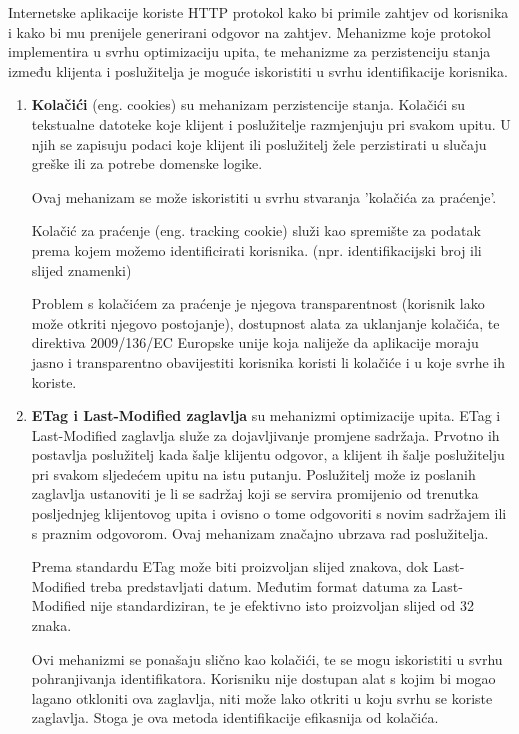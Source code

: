 \documentclass[times, utf8, zavrsni]{fer}
\begin{document}
Internetske aplikacije koriste HTTP protokol kako bi primile zahtjev od
korisnika i kako bi mu prenijele generirani odgovor na zahtjev. Mehanizme koje
protokol implementira u svrhu optimizaciju upita, te mehanizme za perzistenciju
stanja između klijenta i poslužitelja je moguće iskoristiti u svrhu
identifikacije korisnika.

\begin{enumerate}
  \item \textbf{Kolačići} (eng. cookies) su mehanizam perzistencije stanja.
    Kolačići su tekstualne datoteke koje klijent i poslužitelje razmjenjuju pri
    svakom upitu. U njih se zapisuju podaci koje klijent ili poslužitelj
    žele perzistirati u slučaju greške ili za potrebe domenske logike.

    Ovaj mehanizam se može iskoristiti u svrhu stvaranja 'kolačića za praćenje'.

    Kolačić za praćenje (eng. tracking cookie) služi kao spremište za podatak
    prema kojem možemo identificirati korisnika. (npr. identifikacijski broj ili
    slijed znamenki)

    Problem s kolačićem za praćenje je njegova transparentnost (korisnik
    lako može otkriti njegovo postojanje), dostupnost alata za uklanjanje
    kolačića, te direktiva 2009/136/EC Europske unije koja naliježe da
    aplikacije moraju jasno i transparentno obavijestiti korisnika koristi li
    kolačiće i u koje svrhe ih koriste.

  \item \textbf{ETag i Last-Modified zaglavlja} su mehanizmi optimizacije upita.
    ETag i Last-Modified zaglavlja služe za dojavljivanje promjene sadržaja.
    Prvotno ih postavlja poslužitelj kada šalje klijentu odgovor, a klijent ih
    šalje poslužitelju pri svakom sljedećem upitu na istu putanju. Poslužitelj
    može iz poslanih zaglavlja ustanoviti je li se sadržaj koji se servira
    promijenio od trenutka posljednjeg klijentovog upita i ovisno o tome
    odgovoriti s novim sadržajem ili s praznim odgovorom. Ovaj mehanizam
    značajno ubrzava rad poslužitelja.

    Prema standardu ETag može biti proizvoljan slijed znakova, dok Last-Modified
    treba predstavljati datum. Međutim format datuma za Last-Modified nije
    standardiziran, te je efektivno isto proizvoljan slijed od 32 znaka.

    Ovi mehanizmi se ponašaju slično kao kolačići, te se mogu iskoristiti u
    svrhu pohranjivanja identifikatora. Korisniku nije dostupan alat s kojim bi
    mogao lagano otkloniti ova zaglavlja, niti može lako otkriti u koju svrhu se
    koriste zaglavlja. Stoga je ova metoda identifikacije efikasnija od
    kolačića.


\end{enumerate}
\end{document}
